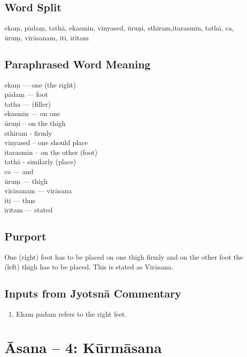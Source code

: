 \subsection*{Word Split}

ekaṃ, pādaṃ,  tathā, ekasmin, vinyased, ūruṇi, sthiram,itarasmin, tathā, ca, ūruṃ, vīrāsanam, iti, īritam

\subsection*{Paraphrased Word Meaning}

\begin{multicols}{2}
ekaṃ --- one (the right)\\
pādaṃ --- foot\\ 
tatha --- (filler)\\  
ekasmin --- on one\\ 
ūruṇi – on the thigh\\ 
sthiram - firmly\\  
vinyased – one should place\\
itarasmin – on the other (foot)\\
tathā  - similarly (place)\\
ca --- and\\
ūruṃ --- thigh\\
vīrāsanam --- vīrāsana\\
iti --- thus\\
īritam --- stated
\end{multicols}

\subsection*{Purport}

One (right) foot has to be placed on one thigh firmly and on the other foot the (left) thigh has to be placed. This is stated as Virāsana.

\subsection*{Inputs from Jyotsnā Commentary}

\begin{enumerate}
\item Ekam padam refers to the right feet.
\end{enumerate}
\newpage

\section*{Āsana -- 4: Kūrmāsana}

